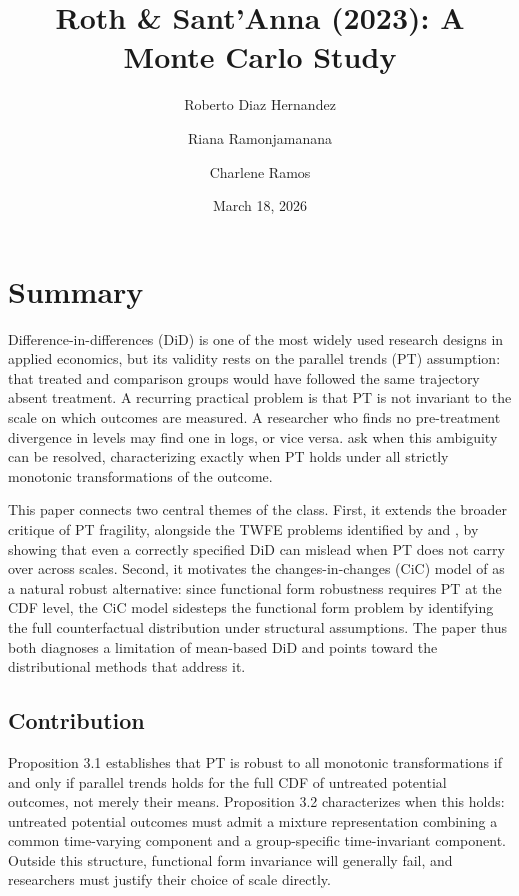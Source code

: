 \documentclass[12pt]{article}
\title{Roth \& Sant'Anna (2023): A Monte Carlo Study}
\author{Roberto Diaz Hernandez \and Riana Ramonjamanana \and Charlene Ramos}
\date{March 18, 2026}
\theoremstyle{remark}
\begin{document}
\maketitle

\section{Summary} 


Difference-in-differences (DiD) is one of the most widely used research designs in applied economics, but its validity rests on the parallel trends (PT) assumption: that treated and comparison groups would have followed the same trajectory absent treatment. A recurring practical problem is that PT is not invariant to the scale on which outcomes are measured. A researcher who finds no pre-treatment divergence in levels may find one in logs, or vice versa. \cite{roth2023parallel} ask when this ambiguity can be resolved, characterizing exactly when PT holds under all strictly monotonic transformations of the outcome.

This paper connects two central themes of the class. First, it extends the broader critique of PT fragility, alongside the TWFE problems identified by \cite{goodmanbacon2021} and \cite{dechaisemartin2020}, by showing that even a correctly specified DiD can mislead when PT does not carry over across scales. Second, it motivates the changes-in-changes (CiC) model of \cite{atheyimbens2006} as a natural robust alternative: since functional form robustness requires PT at the CDF level, the CiC model sidesteps the functional form problem by identifying the full counterfactual distribution under structural assumptions. The paper thus both diagnoses a limitation of mean-based DiD and points toward the distributional methods that address it.

\subsection*{Contribution}

Proposition 3.1 establishes that PT is robust to all monotonic transformations if and only if parallel trends holds for the full CDF of untreated potential outcomes, not merely their means. Proposition 3.2 characterizes when this holds: untreated potential outcomes must admit a mixture representation combining a common time-varying component and a group-specific time-invariant component. Outside this structure, functional form invariance will generally fail, and researchers must justify their choice of scale directly.
\end{document}
